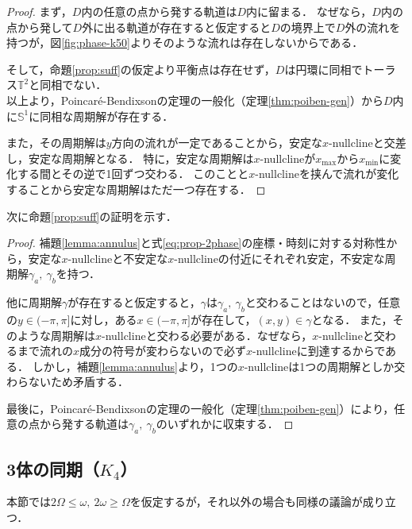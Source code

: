 \documentclass[../main]{subfiles}
\begin{document}
        \begin{proof}
            まず，$D$内の任意の点から発する軌道は$D$内に留まる．
            なぜなら，$D$内の点から発して$D$外に出る軌道が存在すると仮定すると$D$の境界上で$D$外の流れを持つが，図\ref{fig:phase-k50}よりそのような流れは存在しないからである．
            
            そして，命題\ref{prop:suff}の仮定より平衡点は存在せず，$D$は円環に同相でトーラス$\mathbb{T}^2$と同相でない．\\
        以上より，Poincar\'{e}-Bendixsonの定理の一般化（定理\ref{thm:poiben-gen}）から$D$内に$\mathbb{S}^1$に同相な周期解が存在する．
        
        また，その周期解は$y$方向の流れが一定であることから，安定な$x$-nullclineと交差し，安定な周期解となる．
        特に，安定な周期解は$x$-nullclineが$x_{\max}$から$x_{\min}$に変化する間とその逆で1回ずつ交わる．
        このことと$x$-nullclineを挟んで流れが変化することから安定な周期解はただ一つ存在する．    
    \end{proof}
    次に命題\ref{prop:suff}の証明を示す．
    \begin{proof}
        補題\ref{lemma:annulus}と式\eqref{eq:prop-2phase}の座標・時刻に対する対称性から，安定な$x$-nullclineと不安定な$x$-nullclineの付近にそれぞれ安定，不安定な周期解$\gamma_a,\ \gamma_b$を持つ．

        他に周期解$\gamma$が存在すると仮定すると，$\gamma$は$\gamma_a,\ \gamma_b$と交わることはないので，任意の$y\in(-\pi,\pi]$に対し，ある$x\in(-\pi,\pi]$が存在して，$(x,y)\in\gamma$となる．
        また，そのような周期解は$x$-nullclineと交わる必要がある．なぜなら，$x$-nullclineと交わるまで流れの$x$成分の符号が変わらないので必ず$x$-nullclineに到達するからである．
        しかし，補題\ref{lemma:annulus}より，1つの$x$-nullclineは1つの周期解としか交わらないため矛盾する．

        最後に，Poincar\'{e}-Bendixsonの定理の一般化（定理\ref{thm:poiben-gen}）により，任意の点から発する軌道は$\gamma_a,\ \gamma_b$のいずれかに収束する．
    \end{proof}

    \subsection{3体の同期（$K_4$）}
    \label{sec:3body-k4}
    本節では$2\Omega\leq\omega,\ 2\omega\geq\Omega$を仮定するが，それ以外の場合も同様の議論が成り立つ．
\end{document}
